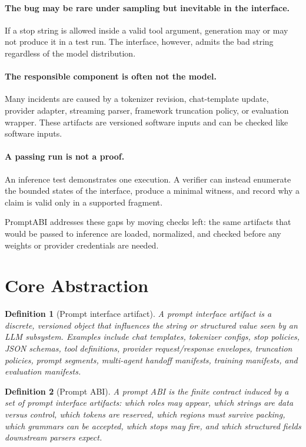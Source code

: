 \documentclass[10pt]{article}
\newtheorem{definition}{Definition}
\begin{document}
\paragraph{The bug may be rare under sampling but inevitable in the interface.}
If a stop string is allowed inside a valid tool argument, generation may or may
not produce it in a test run. The interface, however, admits the bad string
regardless of the model distribution.

\paragraph{The responsible component is often not the model.}
Many incidents are caused by a tokenizer revision, chat-template update,
provider adapter, streaming parser, framework truncation policy, or evaluation
wrapper. These artifacts are versioned software inputs and can be checked like
software inputs.

\paragraph{A passing run is not a proof.}
An inference test demonstrates one execution. A verifier can instead enumerate
the bounded states of the interface, produce a minimal witness, and record why a
claim is valid only in a supported fragment.

PromptABI addresses these gaps by moving checks left: the same artifacts that
would be passed to inference are loaded, normalized, and checked before any
weights or provider credentials are needed.

\section{Core Abstraction}

\begin{definition}[Prompt interface artifact]
A prompt interface artifact is a discrete, versioned object that influences the
string or structured value seen by an LLM subsystem. Examples include chat
templates, tokenizer configs, stop policies, JSON schemas, tool definitions,
provider request/response envelopes, truncation policies, prompt segments,
multi-agent handoff manifests, training manifests, and evaluation manifests.
\end{definition}

\begin{definition}[Prompt ABI]
A prompt ABI is the finite contract induced by a set of prompt interface
artifacts: which roles may appear, which strings are data versus control, which
tokens are reserved, which regions must survive packing, which grammars can be
accepted, which stops may fire, and which structured fields downstream parsers
expect.
\end{definition}
\end{document}
